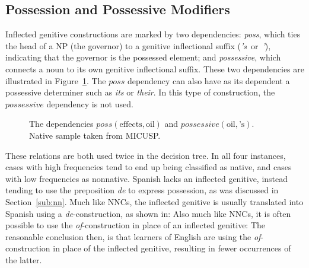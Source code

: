 \documentclass[main.tex]{subfiles}
\begin{document}
\subsection{Possession and Possessive Modifiers}

Inflected genitive constructions are marked by two dependencies: \textit{poss}, which ties the head of a NP (the governor) to a genitive inflectional suffix (\textit{'s}~or~\textit{'}), indicating that the governor is the possessed element; and \textit{possessive}, which connects a noun to its own genitive inflectional suffix. These two dependencies are illustrated in Figure~\ref{fig:poss-deps}. The $poss$ dependency can also have as its dependent a possessive determiner such as \textit{its} or \textit{their}. In this type of construction, the $possessive$ dependency is not used. 

\begin{figure}[htbp]
\centering
{}
\caption{The dependencies $poss(\text{effects}, \text{oil})$ and $possessive(\text{oil}, \text{'s})$. Native sample taken from MICUSP.}
\label{fig:poss-deps}
\end{figure}

These relations are both used twice in the decision tree. In all four instances, cases with high frequencies tend to end up being classified as native, and cases with low frequencies as nonnative. Spanish lacks an inflected genitive, instead tending to use the preposition \textit{de} to express possession, as was discussed in Section~\ref{sub:nn}. Much like NNCs, the inflected genitive is usually translated into Spanish using a \textit{de}-construction, as shown in:
Also much like NNCs, it is often possible to use the \textit{of}-construction in place of an inflected genitive:
The reasonable conclusion then, is that learners of English are using the \textit{of}-construction in place of the inflected genitive, resulting in fewer occurrences of the latter.
\end{document}
